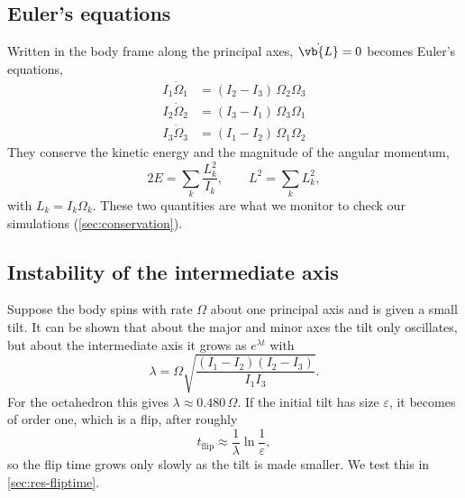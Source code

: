 \subsection{Euler's equations}
\label{sec:euler}
Written in the body frame along the principal axes, $\dot{\vb{L}}=0$ becomes Euler's equations,
\begin{equation}
\begin{aligned}
    I_1\dot\Omega_1 &= (I_2 - I_3)\,\Omega_2\Omega_3\\
    I_2\dot\Omega_2 &= (I_3 - I_1)\,\Omega_3\Omega_1\\
    I_3\dot\Omega_3 &= (I_1 - I_2)\,\Omega_1\Omega_2
\end{aligned}
\label{eq:euler}
\end{equation}
They conserve the kinetic energy and the magnitude of the angular momentum,
\begin{equation}
    2E = \sum_k \frac{L_k^2}{I_k},\qquad L^2 = \sum_k L_k^2,
    \label{eq:conserved}
\end{equation}
with $L_k=I_k\Omega_k$.
These two quantities are what we monitor to check our simulations (\cref{sec:conservation}).

\subsection{Instability of the intermediate axis}
\label{sec:stability}
Suppose the body spins with rate $\Omega$ about one principal axis and is given a small tilt.
It can be shown that about the major and minor axes the tilt only oscillates, but about the intermediate axis it grows as $e^{\lambda t}$ with
\begin{equation}
    \lambda = \Omega\sqrt{\frac{(I_1-I_2)(I_2-I_3)}{I_1 I_3}}.
    \label{eq:lambda}
\end{equation}
For the octahedron this gives $\lambda\approx0.480\,\Omega$.
If the initial tilt has size $\varepsilon$, it becomes of order one, which is a flip, after roughly
\begin{equation}
    t_{\text{flip}} \approx \frac{1}{\lambda}\ln\frac{1}{\varepsilon},
    \label{eq:tflip}
\end{equation}
so the flip time grows only slowly as the tilt is made smaller.
We test this in \cref{sec:res-fliptime}.

